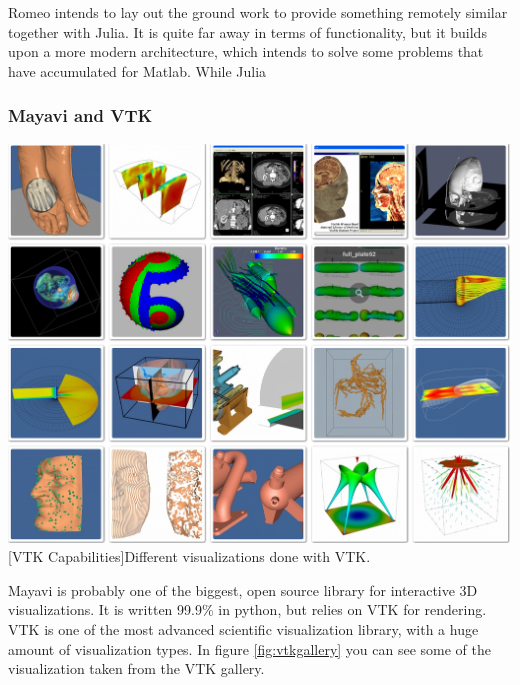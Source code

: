 Romeo intends to lay out the ground work to provide something remotely similar together with Julia. It is quite far away in terms of functionality, but it builds upon a more modern architecture, which intends to solve some problems that have accumulated for Matlab.
While Julia 

\subsubsection{Mayavi and VTK}
\vspace{1em}
\begin{minipage}{\linewidth}
    \centering
    \includegraphics[width=0.9\linewidth]{graphics/vtk.jpg}
    [VTK Capabilities]{Different visualizations done with VTK.}
    \label{fig:vtkgallery}
\end{minipage}
Mayavi is probably one of the biggest, open source library for interactive 3D visualizations.
It is written 99.9\% in python, but relies on \ac{VTK} for rendering.
\ac{VTK} is one of the most advanced scientific visualization library, with a huge amount of visualization types. In figure \ref{fig:vtkgallery} you can see some of the visualization taken from the \ac{VTK} gallery\cite{VTKGallery}.

